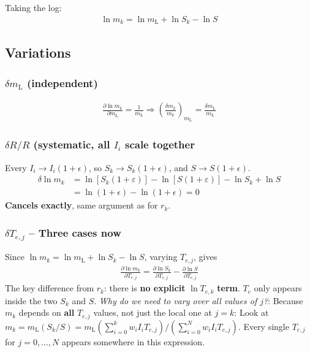 \documentclass[11pt,twoside]{article}
\begin{document}
Taking the log:
\begin{align}
    \ln m_k = \ln m_{\mathrm{L}} + \ln S_k - \ln S
\end{align}
\subsection{Variations}
\subsubsection{$\delta m_{\mathrm{L}}$ (independent)}
\begin{align}
    \frac{\partial \ln m_k}{\partial m_{\mathrm{L}}} = \frac{1}{m_{\mathrm{L}}}
    \Longrightarrow 
    \left( \frac{\delta m_k}{m_k}\right)_{m_{\mathrm{L}}} = \frac{\delta m_{\mathrm{L}}}{m_{\mathrm{L}}}
\end{align}

\subsubsection{$\delta R/R$ (systematic, all $I_i$ scale together}
Every $I_i \to I_i(1+\epsilon)$, so $S_k\to S_k (1+ \epsilon)$, and $S \to S (1+\epsilon)$.
\begin{align*}
    \delta \ln m_k &= \ln \left[S_k (1 + \varepsilon) \right] -  \ln \left[S (1 + \varepsilon) \right]
    - \ln S_k + \ln S \\
    &= \ln (1+\epsilon) - \ln (1+\epsilon) = 0
\end{align*}
\textbf{Cancels exactly}, same argument as for $r_k$.

\subsubsection{$\delta T_{e,j}$ -- Three cases now}
Since $\ln m_k = \ln m_{\mathrm{L}} + \ln S_k - \ln S$, varying $T_{e,j}$, gives
\begin{align}
    \frac{\partial \ln m_k}{\partial T_{e,j}} = \frac{\partial \ln S_k}{\partial T_{e,j}} - \frac{\partial \ln S}{\partial T_{e,j}}
\end{align}
The key difference from $r_k$: there is \textbf{no explicit} $\ln T_{e, k}$ \textbf{term}. $T_e$ only appears inside the two $S_k$ and $S$. \emph{Why do we need to vary over all values of $j$?}: Because $m_k$ depends on \textbf{all} $T_{e,j}$ values, not just the local one at $j=k$: Look at $m_k = m_{\mathrm{L}} (S_k/S) = m_{\mathrm{L}}\left(\sum_{i=0}^k w_i I_i T_{e,j}\right)/\left(\sum_{i=0}^N w_i I_i T_{e,j}\right)$. Every single $T_{e,j}$ for $j=0,\ldots,N$ appears somewhere in this expression.
\end{document}
